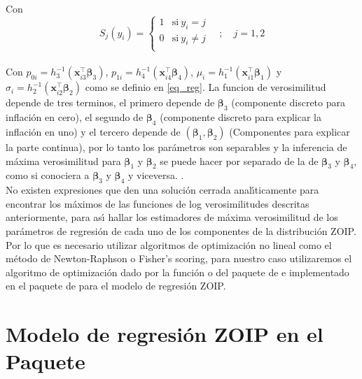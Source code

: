 Con
\[
S_j(y_i)=
\begin{cases}
1 & \text{si}\ y_i=j\\
0 & \text{si}\ y_i\neq j\\
\end{cases}
\quad ; \quad j=1,2
\]
\\
Con $p_{0i}=h_3^{-1}(\mathbf{x}_{i3}^{\top} \boldsymbol{\beta}_3)$, $p_{1i}=h_4^{-1}(\mathbf{x}_{i4}^{\top} \boldsymbol{\beta}_4)$, $\mu_i=h_1^{-1}(\mathbf{x}_{i1}^{\top} \boldsymbol{\beta}_1)$ y $\sigma_i=h_2^{-1}(\mathbf{x}_{i2}^{\top} \boldsymbol{\beta}_2)$ como se definio en \eqref{eq_reg}. La funcion de verosimilitud depende de tres terminos, el primero depende de  $\boldsymbol{\beta}_3$ (componente discreto para inflaci\'{o}n en cero), el segundo de $\boldsymbol{\beta}_4$ (componente discreto para explicar la inflaci\'{o}n en uno) y el tercero depende de $(\boldsymbol{\beta}_1,\boldsymbol{\beta}_2)$ (Componentes para explicar la parte continua), por lo tanto los par\'{a}metros son separables y la inferencia de m\'{a}xima verosimilitud para $\boldsymbol{\beta}_1$ y $\boldsymbol{\beta}_2$ se puede hacer por separado de la de $\boldsymbol{\beta}_3$ y $\boldsymbol{\beta}_4$, como si conociera a $\boldsymbol{\beta}_3$ y $\boldsymbol{\beta}_4$ y viceversa. \citep{Ospina1}.\\

No existen expresiones que den una soluci\'{o}n cerrada anal\'{\i}ticamente para encontrar los m\'{a}ximos de las  funciones de log verosimilitudes descritas anteriormente, para as\'{\i} hallar los estimadores de m\'{a}xima verosimilitud de los par\'{a}metros de regresi\'{o}n de cada uno de los componentes de la distribuci\'{o}n ZOIP.  Por lo que es necesario utilizar algoritmos de optimizaci\'{o}n no lineal como el m\'{e}todo de Newton-Raphson o Fisher's scoring, para nuestro caso utilizaremos el algoritmo de optimizaci\'{o}n dado por la funci\'{o}n  o  del paquete  de  e implementado en el paquete  de  para el modelo de regresi\'{o}n ZOIP.


\section{Modelo de regresi\'{o}n ZOIP en el Paquete }

